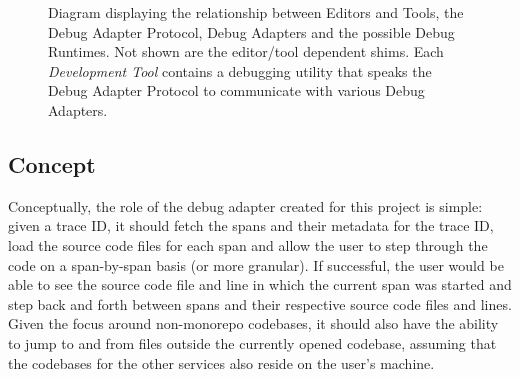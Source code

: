 \documentclass[12pt,pdftex,titlepage]{report}
\begin{document}
                \begin{figure}[hbt!]
                    \centering
                    \caption{Diagram displaying the relationship between Editors and Tools, the Debug Adapter Protocol, Debug Adapters and the possible Debug Runtimes. Not shown are the
                        editor/tool dependent shims. Each \textit{Development Tool} contains a debugging utility that speaks the Debug Adapter Protocol to communicate with various Debug
                        Adapters.}
                    \label{fig:debug-arch}
                \end{figure}

            \subsection{Concept}
                Conceptually, the role of the debug adapter created for this project is simple: given a trace ID, it should fetch the spans and their metadata for the trace ID, load the 
                source code files for each span and allow the user to step through the code on a span-by-span basis (or more granular). If successful, the user would be able to see the
                source code file and line in which the current span was started and step back and forth between spans and their respective source code files and lines. Given the focus
                around non-monorepo codebases, it should also have the ability to jump to and from files outside the currently opened codebase, assuming that the codebases for the other 
                services also reside on the user's machine.
                
\end{document}
